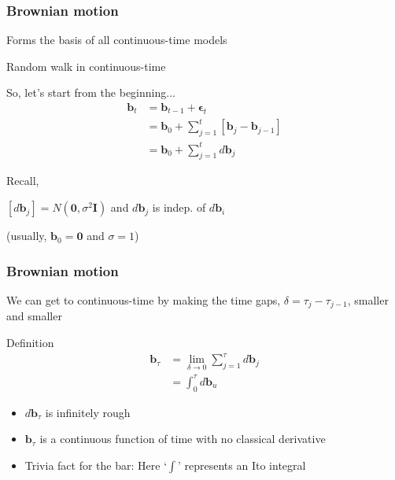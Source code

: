 \documentclass[36pt,handout]{beamer}
\newcommand{\ft}[1]{\frametitle{#1}}
\newcommand{\bb}{\mathbf{b}}
\newcommand{\be}{\boldsymbol{\epsilon}}
\begin{document}

\begin{frame}
\ft{Brownian motion}
Forms the basis of all continuous-time models\medskip

\pause

Random walk in continuous-time \medskip

\pause

So, let's start from the beginning...
$$
\begin{aligned}
\bb_t &= \bb_{t-1} + \be_t \\
&= \bb_0 + \sum_{j=1}^{t}\left[\bb_j-\bb_{j-1}\right] \\
&= \bb_0 + \sum_{j=1}^{t} d\bb_j
\end{aligned}
$$

\pause 

Recall,

$[d\bb_j] = N(\mathbf{0},\sigma^2\mathbf{I})$ and $d\bb_j$ is indep. of $d\bb_i$

(usually, $\bb_0 = \mathbf{0}$ and $\sigma=1$)

\end{frame}


\begin{frame}
\ft{Brownian motion}
We can get to continuous-time by making the time gaps, $\delta = \tau_j-\tau_{j-1}$, smaller and smaller

\pause

\begin{block}{Definition}
$$
\begin{aligned}
\bb_\tau &= \lim_{\delta \to 0} \sum_{j=1}^\tau d\bb_j \\
&= \int_0^\tau d\bb_u
\end{aligned}
$$
\end{block}

\pause

\begin{itemize}
\item $d\bb_\tau$ is infinitely rough
\item $\bb_\tau$ is a continuous function of time with no classical derivative 
\item Trivia fact for the bar: Here `$\int$' represents an Ito integral

\end{itemize}

\end{frame}

\end{document}

